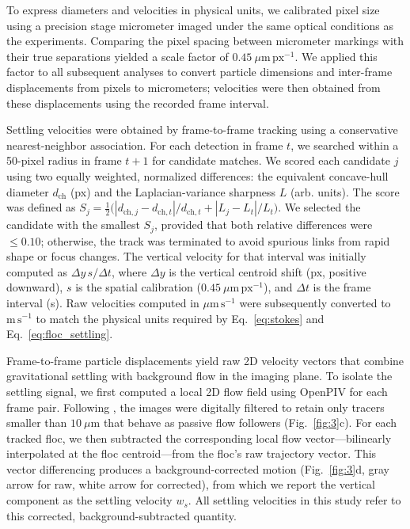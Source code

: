 \documentclass{agujournal2019}
\begin{document}
To express diameters and velocities in physical units, we calibrated pixel size using a precision stage micrometer imaged under the same optical conditions as the experiments. Comparing the pixel spacing between micrometer markings with their true separations yielded a scale factor of \(0.45~\mu\mathrm{m\,px^{-1}}\). We applied this factor to all subsequent analyses to convert particle dimensions and inter-frame displacements from pixels to micrometers; velocities were then obtained from these displacements using the recorded frame interval.

Settling velocities were obtained by frame-to-frame tracking using a conservative nearest-neighbor association. For each detection in frame \(t\), we searched within a 50-pixel radius in frame \(t{+}1\) for candidate matches. We scored each candidate \(j\) using two equally weighted, normalized differences: the equivalent concave-hull diameter \(d_{\mathrm{ch}}\) (px) and the Laplacian-variance sharpness \(L\) (arb. units). The score was defined as \(S_j=\tfrac{1}{2}\big(|d_{\mathrm{ch},j}-d_{\mathrm{ch},t}|/d_{\mathrm{ch},t}+|L_j-L_t|/L_t\big)\). We selected the candidate with the smallest \(S_j\), provided that both relative differences were \(\le 0.10\); otherwise, the track was terminated to avoid spurious links from rapid shape or focus changes. The vertical velocity for that interval was initially computed as \(\Delta y\,s/\Delta t\), where \(\Delta y\) is the vertical centroid shift (px, positive downward), \(s\) is the spatial calibration (\(0.45~\mu\mathrm{m\,px^{-1}}\)), and \(\Delta t\) is the frame interval (s). Raw velocities computed in \(\mu\mathrm{m\,s^{-1}}\) were subsequently converted to \(\mathrm{m\,s^{-1}}\) to match the physical units required by Eq.~\eqref{eq:stokes} and Eq.~\eqref{eq:floc_settling}.

Frame-to-frame particle displacements yield raw 2D velocity vectors that combine gravitational settling with background flow in the imaging plane. To isolate the settling signal, we first computed a local 2D flow field using OpenPIV \cite{liberzon2021openpiv} for each frame pair. Following , the images were digitally filtered to retain only tracers smaller than $10~\mu\mathrm{m}$ that behave as passive flow followers (Fig.~\ref{fig:3}c). For each tracked floc, we then subtracted the corresponding local flow vector---bilinearly interpolated at the floc centroid---from the floc's raw trajectory vector. This vector differencing produces a background-corrected motion (Fig.~\ref{fig:3}d, gray arrow for raw, white arrow for corrected), from which we report the vertical component as the settling velocity \(w_s\). All settling velocities in this study refer to this corrected, background-subtracted quantity.
\end{document}
